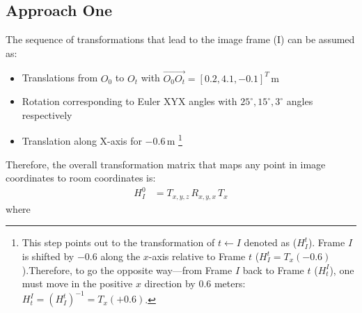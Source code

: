 \documentclass[12pt, a4paper]{article}
\begin{document}
\subsection*{Approach One}
The sequence of transformations that lead to the image frame (I) can be assumed as:
\begin{itemize}
	\item Translations from \(O_0\) to \(O_t\) with \(\vec{O_0 O_t} = [0.2, 4.1, -0.1]^T \,\mathrm{m}\)
	\item Rotation corresponding to Euler XYX angles with \(25^\circ, 15^\circ, 3^\circ\) angles respectively
	\item Translation along X-axis for \(-0.6\,\mathrm{m}\) \footnote{
		      This step points out to the transformation of $t \leftarrow I$ denoted as ($H_I^t$). Frame $I$ is shifted by $-0.6$ along the $x$-axis relative to Frame $t$ ($H_I^t = T_{x}(-0.6)$).Therefore, to go the opposite way—from Frame $I$ back to Frame $t$ ($H_t^I$), one must move in the positive $x$ direction by $0.6$ meters: $H_t^I = (H_I^t)^{-1} = T_{x}(+0.6)$.
	      }
\end{itemize}
Therefore, the overall transformation matrix that maps any point in image coordinates to room coordinates is:
\begin{align}
	H_I^0 & = T_{x, y, z} \, R_{x, y, x} \, T_{x}
\end{align}
where
\end{document}
